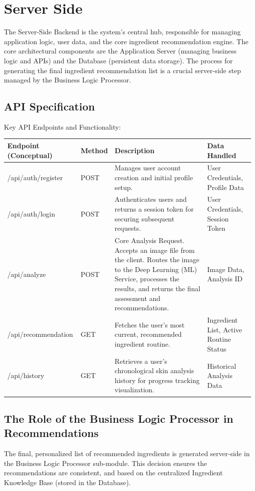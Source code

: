\documentclass[12pt,a4paper]{article}
\begin{document}
\section{Server Side}
The Server-Side Backend is the system's central hub, responsible for managing application logic, user data, and the core ingredient recommendation engine. The core architectural components are the Application Server (managing business logic and APIs) and the Database (persistent data storage). The process for generating the final ingredient recommendation list is a crucial server-side step managed by the Business Logic Processor.

\subsection{API Specification}
Key API Endpoints and Functionality:

\begin{table}[h]
\centering
\begin{tabularx}{\textwidth}{|l|l|X|l|}
\hline
\textbf{Endpoint (Conceptual)} & \textbf{Method} & \textbf{Description} & \textbf{Data Handled} \\
\hline
/api/auth/register & POST & Manages user account creation and initial profile setup. & User Credentials, Profile Data \\
\hline
/api/auth/login & POST & Authenticates users and returns a session token for securing subsequent requests. & User Credentials, Session Token \\
\hline
/api/analyze & POST & Core Analysis Request. Accepts an image file from the client. Routes the image to the Deep Learning (ML) Service, processes the results, and returns the final assessment and recommendations. & Image Data, Analysis ID \\
\hline
/api/recommendation & GET & Fetches the user's most current, recommended ingredient routine. & Ingredient List, Active Routine Status \\
\hline
/api/history & GET & Retrieves a user's chronological skin analysis history for progress tracking visualization. & Historical Analysis Data \\
\hline
\end{tabularx}
\end{table}

\subsection{The Role of the Business Logic Processor in Recommendations}
The final, personalized list of recommended ingredients is generated server-side in the Business Logic Processor sub-module. This decision ensures the recommendations are consistent, and based on the centralized Ingredient Knowledge Base (stored in the Database).
\end{document}
